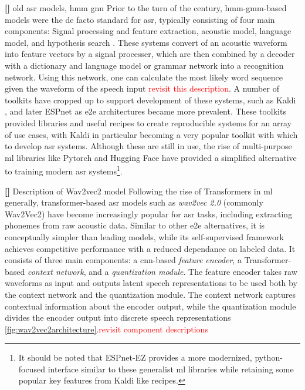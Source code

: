 \documentclass[thesis]{cluu}
\newcounter{paranum}
\newcommand{\numberedparagraph}{\par\refstepcounter{paranum}\textbf{[\theparanum] }}
\newcommand{\todo}[1]{\textcolor{red}{#1}}
\begin{document}
\numberedparagraph{old asr models, hmm gnn}
Prior to the turn of the century, \gls{hmm}-\gls{gmm}-based models were the de facto standard for \gls{asr}, typically consisting of four main components: Signal processing and feature extraction, acoustic model, language model, and hypothesis search \parencite{yuAutomaticSpeechRecognition2015}. These systems convert of an acoustic waveform into feature vectors by a signal processer, which are then combined by a decoder with a dictionary and language model or grammar network into a recognition network. Using this network, one can calculate the most likely word sequence given the waveform of the speech input \parencite{witt2000use} \todo{revisit this description}. A number of toolkits have cropped up to support development of these systems, such as Kaldi \parencite{poveyKaldiSpeechRecognition}, and later ESPnet \parencite{watanabeESPnetEndtoEndSpeech2018} as \gls{e2e} architectures became more prevalent. These toolkits provided libraries and useful recipes to create reproducible systems for an array of use cases, with Kaldi in particular becoming a very popular toolkit with which to develop \gls{asr} systems. Although these are still in use, the rise of multi-purpose \gls{ml} libraries like Pytorch \parencite{paszkePyTorchImperativeStyle2019} and Hugging Face \parencite{wolfTransformersStateoftheArtNatural2020} have provided a simplified alternative to training modern \gls{asr} systems\footnote{It should be noted that ESPnet-EZ \parencite{somekiESPnetEZPythononlyESPnet2024} provides a more modernized, python-focused interface similar to these generalist \gls{ml} libraries while retaining some popular key features from Kaldi like recipes.}. 

\numberedparagraph{Description of Wav2vec2 model}
Following the rise of Transformers in \gls{ml} generally, transformer-based \gls{asr} models such as \textit{wav2vec 2.0} (commonly Wav2Vec2) have become increasingly popular for \gls{asr} tasks, including extracting phonemes from raw acoustic data. Similar to other \gls{e2e} alternatives, it is conceptually simpler than leading models, while its self-supervised framework achieves competitive performance with a reduced dependance on labeled data. It consists of three main components: a \gls{cnn}-based \textit{feature encoder}, a Transformer-based \textit{context network}, and a \textit{quantization module}. The feature encoder takes raw waveforms as input and outputs latent speech representations to be used both by the context network and the quantization module. The context network captures contextual information about the encoder output, while the quantization module divides the encoder output into discrete speech representations \ref{fig:wav2vec2architecture}.\todo{revisit component descriptions} 
\end{document}
